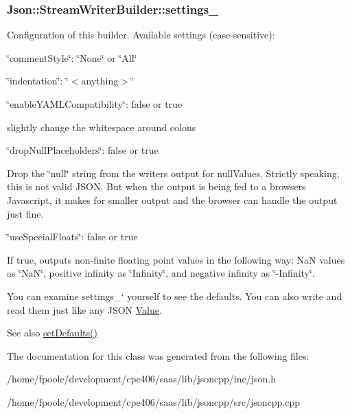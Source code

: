 \subsubsection[{settings\+\_\+}]{ Json\+::\+Stream\+Writer\+Builder\+::settings\+\_\+}\label{class_json_1_1_stream_writer_builder_a79bdf2e639a52f4e758c0b95bd1d3423}
Configuration of this builder. Available settings (case-\/sensitive)\+:
\begin{DoxyItemize}
\item \char`\"{}comment\+Style\char`\"{}\+: \char`\"{}\+None\char`\"{} or \char`\"{}\+All\char`\"{}
\item \char`\"{}indentation\char`\"{}\+: \char`\"{}$<$anything$>$\char`\"{}
\item \char`\"{}enable\+Y\+A\+M\+L\+Compatibility\char`\"{}\+: false or true
\begin{DoxyItemize}
\item slightly change the whitespace around colons
\end{DoxyItemize}
\item \char`\"{}drop\+Null\+Placeholders\char`\"{}\+: false or true
\begin{DoxyItemize}
\item Drop the \char`\"{}null\char`\"{} string from the writer\textquotesingle{}s output for null\+Values. Strictly speaking, this is not valid J\+S\+O\+N. But when the output is being fed to a browser\textquotesingle{}s Javascript, it makes for smaller output and the browser can handle the output just fine.
\end{DoxyItemize}
\item \char`\"{}use\+Special\+Floats\char`\"{}\+: false or true
\begin{DoxyItemize}
\item If true, outputs non-\/finite floating point values in the following way\+: Na\+N values as \char`\"{}\+Na\+N\char`\"{}, positive infinity as \char`\"{}\+Infinity\char`\"{}, and negative infinity as \char`\"{}-\/\+Infinity\char`\"{}.
\end{DoxyItemize}
\end{DoxyItemize}

You can examine \textquotesingle{}settings\+\_\+` yourself to see the defaults. You can also write and read them just like any J\+S\+O\+N \hyperlink{class_json_1_1_value}{Value}. \begin{DoxySeeAlso}{See also}
\hyperlink{class_json_1_1_stream_writer_builder_a53bf106b141e28637b01ad0ecd2acbf6}{set\+Defaults()} 
\end{DoxySeeAlso}


The documentation for this class was generated from the following files\+:\begin{DoxyCompactItemize}
\item 
/home/fpoole/development/cpe406/saas/lib/jsoncpp/inc/json.\+h\item 
/home/fpoole/development/cpe406/saas/lib/jsoncpp/src/jsoncpp.\+cpp\end{DoxyCompactItemize}
